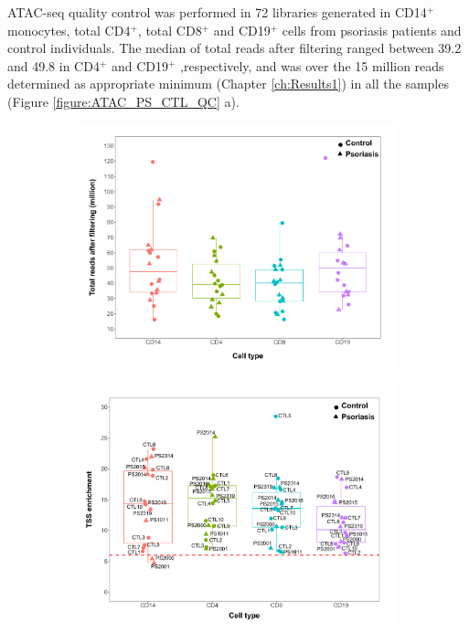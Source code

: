 ATAC-seq quality control was performed in 72 libraries generated in CD14$^+$ monocytes, total CD4$^+$, total CD8$^+$ and CD19$^+$ cells from psoriasis patients and control individuals. The median of total reads after filtering ranged between 39.2 and 49.8 in CD4$^+$ and CD19$^+$ ,respectively, and was over the 15 million reads determined as appropriate minimum (Chapter \ref{ch:Results1}) in all the samples (Figure \ref{figure:ATAC_PS_CTL_QC} a). 



\begin{figure}[htbp]
\centering
\begin{subfigure}{0.5\textwidth}
\centering
\includegraphics[width=\textwidth]{./Results2/pdfs/ATAC_PS_CTL_final_filtered_reads_boxplot}
\caption{\textbf{}}
\end{subfigure}%
\begin{subfigure}{0.5\textwidth}
\centering
\includegraphics[width=\textwidth]{./Results2/pdfs/ATAC_PS_CTL_all_samples_TSS_boxplots_all_labelled}

\end{subfigure}
\end{figure}
